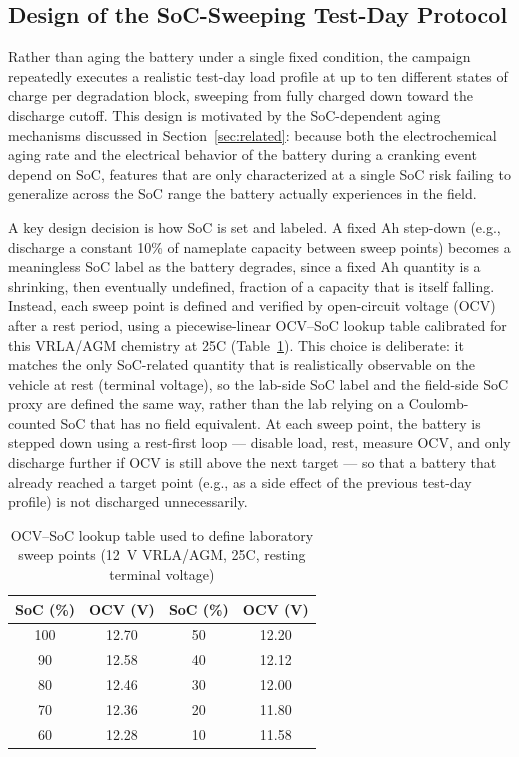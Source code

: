 \documentclass[conference]{IEEEtran}
\begin{document}
\subsection{Design of the SoC-Sweeping Test-Day Protocol}
\label{sec:testdays}

Rather than aging the battery under a single fixed condition, the campaign repeatedly executes a realistic test-day load profile at up to ten different states of charge per degradation block, sweeping from fully charged down toward the discharge cutoff. This design is motivated by the SoC-dependent aging mechanisms discussed in Section~\ref{sec:related}: because both the electrochemical aging rate and the electrical behavior of the battery during a cranking event depend on SoC, features that are only characterized at a single SoC risk failing to generalize across the SoC range the battery actually experiences in the field.

A key design decision is how SoC is set and labeled. A fixed Ah step-down (e.g., discharge a constant 10\% of nameplate capacity between sweep points) becomes a meaningless SoC label as the battery degrades, since a fixed Ah quantity is a shrinking, then eventually undefined, fraction of a capacity that is itself falling. Instead, each sweep point is defined and verified by open-circuit voltage (OCV) after a rest period, using a piecewise-linear OCV--SoC lookup table calibrated for this VRLA/AGM chemistry at 25\textdegree{}C (Table~\ref{tab:testdays}). This choice is deliberate: it matches the only SoC-related quantity that is realistically observable on the vehicle at rest (terminal voltage), so the lab-side SoC label and the field-side SoC proxy are defined the same way, rather than the lab relying on a Coulomb-counted SoC that has no field equivalent. At each sweep point, the battery is stepped down using a rest-first loop --- disable load, rest, measure OCV, and only discharge further if OCV is still above the next target --- so that a battery that already reached a target point (e.g., as a side effect of the previous test-day profile) is not discharged unnecessarily.

\begin{table}[t]
\centering
\caption{OCV--SoC lookup table used to define laboratory sweep points (12~V VRLA/AGM, 25\textdegree{}C, resting terminal voltage)}
\label{tab:testdays}
\begin{tabular}{c c || c c}
\hline
\textbf{SoC (\%)} & \textbf{OCV (V)} & \textbf{SoC (\%)} & \textbf{OCV (V)} \\
\hline
100 & 12.70 & 50 & 12.20 \\
90  & 12.58 & 40 & 12.12 \\
80  & 12.46 & 30 & 12.00 \\
70  & 12.36 & 20 & 11.80 \\
60  & 12.28 & 10 & 11.58 \\
\hline
\end{tabular}
\end{table}
\end{document}
